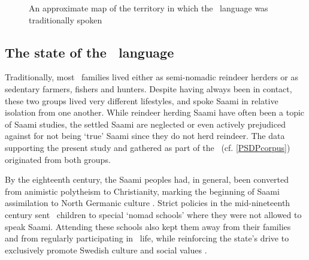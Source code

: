 \setlength\fboxsep{0pt}
\setlength\fboxrule{1pt}
\begin{figure}
\centering
{}
\parbox{150mm}{\caption{An approximate map of the territory in which the \PS\ language was traditionally spoken\label{piteTerritory}}}%
\end{figure}%

\FB

\subsection{The state of the \PS\ language}\label{sociolinguistics}
Traditionally, most \PS\ families lived either as semi-nomadic reindeer herders or as sedentary farmers, fishers and hunters. Despite having always been in contact, these two groups lived very different lifestyles, and spoke Saami in relative isolation from one another. While reindeer herding Saami have often been a topic of Saami studies, the settled Saami are neglected or even actively prejudiced against for not being ‘true’ Saami since they do not herd reindeer. The data supporting the present study and gathered as part of the \PSDP\ (cf. \SEC\ref{PSDPcorpus}) originated from both groups.

By the eighteenth century, the Saami peoples had, in general, been converted from animistic polytheism to Christianity, marking the beginning of Saami assimilation to North Germanic culture \citep[cf.][]{Pulkkinen2005}. %
Strict policies in the mid-nineteenth century sent \PS\ children to special ‘nomad schools’ where they were not allowed to speak Saami. Attending these schools also kept them away from their families and from regularly participating in \PS\ life, while reinforcing the state’s drive to exclusively promote Swedish culture and social values \citep[cf.][]{ValijarviWilbur2011}. 

